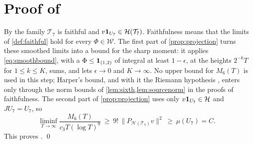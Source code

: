 \documentclass[11pt,colorlinks]{charlie}
\begin{document}
\section{Proof of }\label{sec:main}

By  the family $\mathcal T_7$ is faithful and $v\mathbf{1}_{U_7}\in\mathcal H(\mathcal T_7)$. Faithfulness means that the limits of \cref{def:faithful} hold for every $\Phi\in\mathcal W$. The first part of \cref{prop:projection} turns these smoothed limits into a bound for the sharp moment: it applies \eqref{eq:smoothbound}, with a $\Phi\le\mathbf{1}_{(1,2)}$ of integral at least $1-\epsilon$, at the heights $2^{-k}T$ for $1\le k\le K$, sums, and lets $\epsilon\to0$ and $K\to\infty$. No upper bound for $M_6(T)$ is used in this step; Harper's bound, and with it the Riemann hypothesis \cite{Alpoge}, enters only through the norm bounds of \cref{lem:sixth,lem:sourcenorm} in the proofs of faithfulness. The second part of \cref{prop:projection} uses only $v\mathbf{1}_{U_7}\in\mathcal H$ and $JU_7=U_7$, so
\[
 \liminf_{T\to\infty}\frac{M_6(T)}{c_3T(\log T)^9}\ \ge\ 9!\,\|P_{\mathcal H(\mathcal T_7)}v\|^2\ \ge\ \mu(U_7)=C .
\]
This proves . \qed
\end{document}
